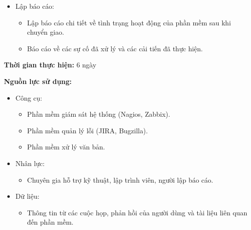{\begin{minipage}{\textwidth}
\begin{itemize}
\begin{itemize}
                      \item Thu thập phản hồi từ người dùng để cải tiến và nâng cao chất lượng phần mềm.
                      \item Thực hiện các thay đổi và cập nhật phần mềm dựa trên yêu cầu của người dùng và quản lý.
                  \end{itemize}
            \item Lập báo cáo:
                  \begin{itemize}
                      \item Lập báo cáo chi tiết về tình trạng hoạt động của phần mềm sau khi chuyển giao.
                      \item Báo cáo về các sự cố đã xử lý và các cải tiến đã thực hiện.
                  \end{itemize}
        \end{itemize}

        \noindent\textbf{Thời gian thực hiện:} 6 ngày

        \noindent\textbf{Nguồn lực sử dụng:}
        \begin{itemize}
            \item Công cụ:
                  \begin{itemize}
                      \item Phần mềm giám sát hệ thống (Nagios, Zabbix).
                      \item Phần mềm quản lý lỗi (JIRA, Bugzilla).
                      \item Phần mềm xử lý văn bản.
                  \end{itemize}
            \item Nhân lực:
                  \begin{itemize}
                      \item Chuyên gia hỗ trợ kỹ thuật, lập trình viên, người lập báo cáo.
                  \end{itemize}
            \item Dữ liệu:
                  \begin{itemize}
                      \item Thông tin từ các cuộc họp, phản hồi của người dùng và tài liệu liên quan đến phần mềm.
                  \end{itemize}
        \end{itemize}
    \end{minipage} \\
}
\newpage
